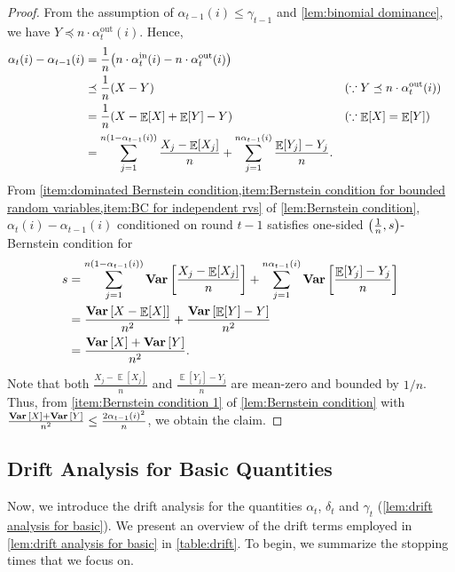\documentclass[letterpaper,11pt]{article}
\DeclareMathOperator*{\E}{\mathbb{E}}
\DeclareMathOperator*{\Var}{\mathbf{Var}}
\newcommand{\Nat}{\mathbb{N}}
\newcommand{\alphanorm}{\gamma}
\newcommand{\alphain}{\alpha^{\mathrm{in}}}
\newcommand{\alphaout}{\alpha^{\mathrm{out}}}
\newcommand{\Bin}{\mathrm{Bin}}
\begin{document}
\begin{proof}
    From the assumption of $\alpha_{t-1}(i)\leq \alphanorm_{t-1}$ and \cref{lem:binomial dominance}, we have $Y\preceq n\cdot \alphaout_t(i)$.
    Hence, 
    \begin{align*}
        \alpha_t(i) - \alpha_{t-1}(i) 
        &=\frac{1}{n}\qty( n\cdot \alphain_t(i)-n\cdot \alphaout_t(i))\\
        &\preceq \frac{1}{n}(X-Y) && (\because Y\preceq n\cdot \alphaout_t(i))\\
        &=\frac{1}{n}\qty(X-\E[X]+\E[Y]-Y) && (\because \E[X]=\E[Y])\\
        &=\sum_{j=1}^{n(1-\alpha_{t-1}(i))}\frac{X_j-\E[X_j]}{n}+\sum_{j=1}^{n\alpha_{t-1}(i)}\frac{\E[Y_j]-Y_j}{n}.
    \end{align*}
    From \cref{item:dominated Bernstein condition,item:Bernstein condition for bounded random variables,item:BC for independent rvs} of \cref{lem:Bernstein condition}, $\alpha_t(i) - \alpha_{t-1}(i)$ conditioned on round $t-1$ satisfies one-sided $\qty(\frac{1}{n},s)$-Bernstein condition for 
    \begin{align*}
    s&=\sum_{j=1}^{n(1-\alpha_{t-1}(i))}\Var\qty[\frac{X_j-\E[X_j]}{n}]+\sum_{j=1}^{n\alpha_{t-1}(i)}\Var\qty[\frac{\E[Y_j]-Y_j}{n}]\\
    &=\frac{\Var\qty[X-\E[X]]}{n^2}+\frac{\Var\qty[\E[Y]-Y]}{n^2}\\
    &=\frac{\Var\qty[X]+\Var\qty[Y]}{n^2}.
    \end{align*}
    Note that  both $\frac{X_j-\E[X_j]}{n}$ and $\frac{\E[Y_j]-Y_j}{n}$ are mean-zero and bounded by $1/n$. 
    Thus, from \cref{item:Bernstein condition 1} of \cref{lem:Bernstein condition} with $\frac{\Var\qty[X]+\Var\qty[Y]}{n^2}\leq \frac{2\alpha_{t-1}(i)^2}{n}$, we obtain the claim.
  \end{proof}

 
\subsection{Drift Analysis for Basic Quantities} \label{sec:drift analysus for sync processes}
Now, we introduce the drift analysis for the quantities $\alpha_t$, $\delta_t$ and $\alphanorm_t$ (\cref{lem:drift analysis for basic}).
We present an overview of the drift terms employed in \cref{lem:drift analysis for basic} in \cref{table:drift}.
To begin, we summarize the stopping times that we focus on. 
\end{document}
